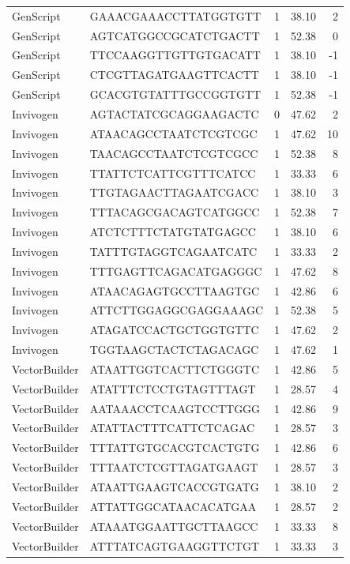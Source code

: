\documentclass[
]{article}
\begin{document}
\begin{longtable}[]{@{}llrrr@{}}
GenScript & GAAACGAAACCTTATGGTGTT & 1 & 38.10 & 2 \\
GenScript & AGTCATGGCCGCATCTGACTT & 1 & 52.38 & 0 \\
GenScript & TTCCAAGGTTGTTGTGACATT & 1 & 38.10 & -1 \\
GenScript & CTCGTTAGATGAAGTTCACTT & 1 & 38.10 & -1 \\
GenScript & GCACGTGTATTTGCCGGTGTT & 1 & 52.38 & -1 \\
Invivogen & AGTACTATCGCAGGAAGACTC & 0 & 47.62 & 2 \\
Invivogen & ATAACAGCCTAATCTCGTCGC & 1 & 47.62 & 10 \\
Invivogen & TAACAGCCTAATCTCGTCGCC & 1 & 52.38 & 8 \\
Invivogen & TTATTCTCATTCGTTTCATCC & 1 & 33.33 & 6 \\
Invivogen & TTGTAGAACTTAGAATCGACC & 1 & 38.10 & 3 \\
Invivogen & TTTACAGCGACAGTCATGGCC & 1 & 52.38 & 7 \\
Invivogen & ATCTCTTTCTATGTATGAGCC & 1 & 38.10 & 6 \\
Invivogen & TATTTGTAGGTCAGAATCATC & 1 & 33.33 & 2 \\
Invivogen & TTTGAGTTCAGACATGAGGGC & 1 & 47.62 & 8 \\
Invivogen & ATAACAGAGTGCCTTAAGTGC & 1 & 42.86 & 6 \\
Invivogen & ATTCTTGGAGGCGAGGAAAGC & 1 & 52.38 & 5 \\
Invivogen & ATAGATCCACTGCTGGTGTTC & 1 & 47.62 & 2 \\
Invivogen & TGGTAAGCTACTCTAGACAGC & 1 & 47.62 & 1 \\
VectorBuilder & ATAATTGGTCACTTCTGGGTC & 1 & 42.86 & 5 \\
VectorBuilder & ATATTTCTCCTGTAGTTTAGT & 1 & 28.57 & 4 \\
VectorBuilder & AATAAACCTCAAGTCCTTGGG & 1 & 42.86 & 9 \\
VectorBuilder & ATATTACTTTCATTCTCAGAC & 1 & 28.57 & 3 \\
VectorBuilder & TTTATTGTGCACGTCACTGTG & 1 & 42.86 & 6 \\
VectorBuilder & TTTAATCTCGTTAGATGAAGT & 1 & 28.57 & 3 \\
VectorBuilder & ATAATTGAAGTCACCGTGATG & 1 & 38.10 & 2 \\
VectorBuilder & ATTATTGGCATAACACATGAA & 1 & 28.57 & 2 \\
VectorBuilder & ATAAATGGAATTGCTTAAGCC & 1 & 33.33 & 8 \\
VectorBuilder & ATTTATCAGTGAAGGTTCTGT & 1 & 33.33 & 3 \\
\end{longtable}
\end{document}
